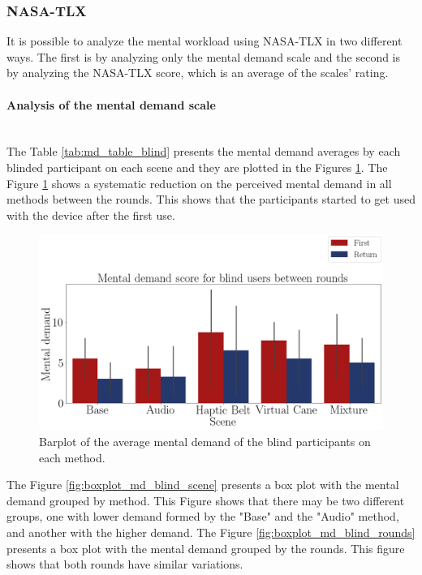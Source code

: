 \subsubsection{NASA-TLX}
\label{subsubsec:results_nasa_tlx_1}

It is possible to analyze the mental workload using NASA-TLX in two different ways. The first is by analyzing only the mental demand scale and the second is by analyzing the NASA-TLX score, which is an average of the scales’ rating.

\paragraph{Analysis of the mental demand scale}\mbox{}\\

The Table \ref{tab:md_table_blind} presents the mental demand averages by each blinded participant on each scene and they are plotted in the Figures \ref{fig:barplot_md_avg_5_scene_blind}. The Figure \ref{fig:barplot_md_avg_5_scene_blind} shows a systematic reduction on the perceived mental demand in all methods between the rounds. This shows that the participants started to get used with the device after the first use.



\begin{figure}[!htb]
    \centering
    \includegraphics[width = 0.8\linewidth]{Resultados/Nasa/Figuras/png/barplot_md_avg_5_scene_blind.png}
    \caption{Barplot of the average mental demand of the blind participants on each method.}
    \label{fig:barplot_md_avg_5_scene_blind}
\end{figure}

The Figure \ref{fig:boxplot_md_blind_scene} presents a box plot with the mental demand grouped by method. This Figure shows that there may be two different groups, one with lower demand formed by the "Base" and the "Audio" method, and another with the higher demand. The Figure \ref{fig:boxplot_md_blind_rounds} presents a box plot with the mental demand grouped by the rounds. This figure shows that both rounds have similar variations.


